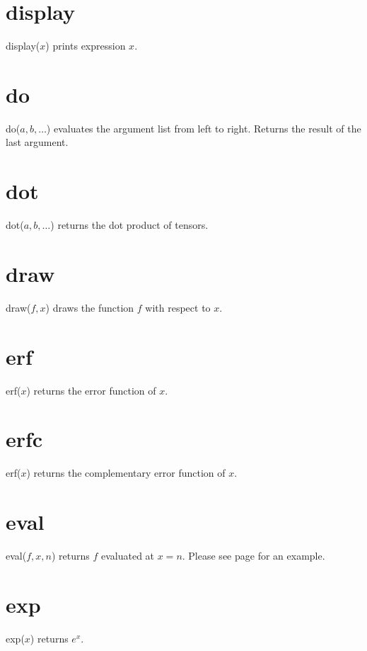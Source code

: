\documentclass[12pt,openany]{report}
\begin{document}
\section*{display}
display($x$) prints expression $x$.

\section*{do}
do($a,b,\ldots$) evaluates the argument list from left to right.
Returns the result of the last argument.

\section*{dot}
dot($a,b,\ldots$) returns the dot product of tensors.

\section*{draw}
draw($f,x$) draws the function $f$ with respect to $x$.

\section*{erf}
erf($x$) returns the error function of $x$.

\section*{erfc}
erf($x$) returns the complementary error function of $x$.

\section*{eval}
eval($f,x,n$) returns $f$ evaluated at $x=n$.
Please see page \pageref{integral} for an example.

\section*{exp}
exp($x$) returns $e^x$.
\end{document}

